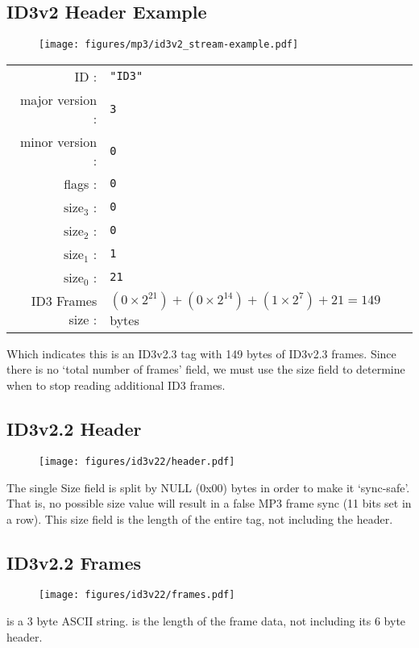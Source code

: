 \clearpage

\subsection{ID3v2 Header Example}
\begin{figure}[h]
  \texttt{[image: figures/mp3/id3v2\_stream-example.pdf]}
\end{figure}
\begin{table}[h]
  \begin{tabular}{rl}
    ID : & \texttt{"ID3"} \\
    major version : & \texttt{3} \\
    minor version : & \texttt{0} \\
    flags : & \texttt{0} \\
    $\text{size}_3$ : & \texttt{0} \\
    $\text{size}_2$ : & \texttt{0} \\
    $\text{size}_1$ : & \texttt{1} \\
    $\text{size}_0$ : & \texttt{21} \\
    ID3 Frames size : & $(0 \times 2 ^ {21}) + (0 \times 2 ^ {14}) + (1 \times 2 ^ 7) + 21 = 149$ bytes \\
  \end{tabular}
\end{table}
\par
\noindent
Which indicates this is an ID3v2.3 tag with 149 bytes of ID3v2.3 frames.
Since there is no `total number of frames' field,
we must use the size field to determine when to stop reading
additional ID3 frames.

\clearpage

\subsection{ID3v2.2 Header}

\begin{figure}[h]
\texttt{[image: figures/id3v22/header.pdf]}
\end{figure}
\par
\noindent
The single Size field is split by NULL (0x00) bytes in order to make
it `sync-safe'.
That is, no possible size value will result in a false
MP3 frame sync (11 bits set in a row).
This size field is the length of the entire tag, not including the header.

\subsection{ID3v2.2 Frames}
\begin{figure}[h]
\texttt{[image: figures/id3v22/frames.pdf]}
\end{figure}
\par
\noindent
{} is a 3 byte ASCII string.
 is the length of the frame data,
not including its 6 byte header.

